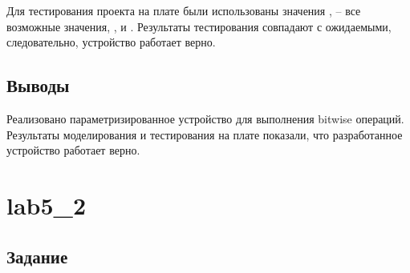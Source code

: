 Для тестирования проекта на плате были использованы значения  ,  -- все возможные значения, ,  и . Результаты тестирования совпадают с ожидаемыми, следовательно, устройство работает верно.

\subsection{Выводы}

Реализовано параметризированное устройство для выполнения bitwise операций. Результаты моделирования и тестирования на плате показали, что разработанное устройство работает верно.

\section{lab5\_2}

\subsection{Задание}

